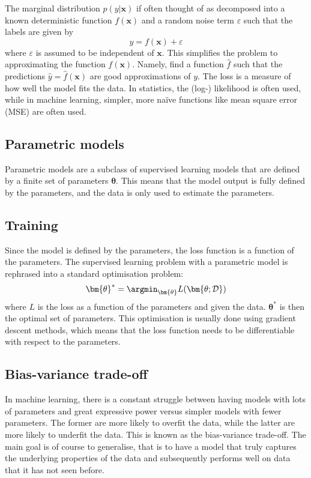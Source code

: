 The marginal distribution $p(y|\bm{x})$ if often thought of as decomposed into a known deterministic function $f(\bm{x})$ and a random noise term $\varepsilon$ such that the labels are given by
\begin{equation}
    y = f(\bm{x}) + \varepsilon
    \label{eq:ml_model}
\end{equation}
where $\varepsilon$ is assumed to be independent of $\bm{x}$.
This simplifies the problem to approximating the function $f(\bm{x})$.
Namely, find a function $\hat{f}$ such that the predictions $\hat{y}=\hat{f}(\bm{x})$ are good approximations of $y$.
The loss is a measure of how well the model fits the data.
In statistics, the (log-) likelihood is often used, while in machine learning, simpler, more naïve functions like mean square error (MSE) are often used.


\subsection{Parametric models}
Parametric models are a subclass of supervised learning models that are defined by a finite set of parameters $\bm{\theta}$.
This means that the model output is fully defined by the parameters, and the data is only used to estimate the parameters.

\subsection{Training}
Since the model is defined by the parameters, the loss function is a function of the parameters.
The supervised learning problem with a parametric model is rephrased into a standard optimisation problem:
\begin{equation}
    \bm{\theta}^* = \argmin_{\bm{\theta}} L(\bm{\theta; \mathcal{D}})
\end{equation}
where $L$ is the loss as a function of the parameters and given the data.
$\bm{\theta}^*$ is then the optimal set of parameters.
This optimisation is usually done using gradient descent methods, which means that the loss function needs to be differentiable with respect to the parameters.


\subsection{Bias-variance trade-off}
In machine learning, there is a constant struggle between having models with lots of parameters and great expressive power versus simpler models with fewer parameters.
The former are more likely to overfit the data, while the latter are more likely to underfit the data.
This is known as the bias-variance trade-off.
The main goal is of course to generalise, that is to have a model that truly captures the underlying properties of the data and subsequently performs well on data that it has not seen before.

